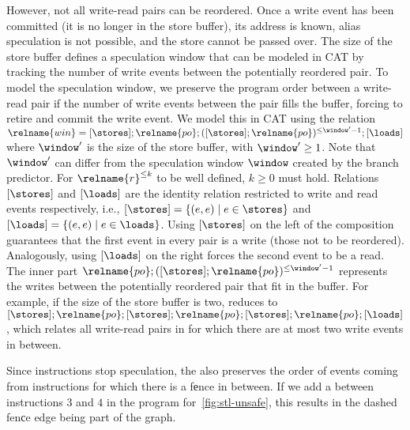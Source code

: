\documentclass[conference]{IEEEtran}
\begin{document}
However, not all write-read pairs can be reordered.
Once a write event has been committed (it is no longer in the store buffer), its address is known, alias speculation is not possible, and the store cannot be passed over.
The size of the store buffer defines a speculation window that can be modeled in CAT by tracking the number of write events between the potentially reordered pair.
To model the speculation window, we preserve the program order between a write-read pair if the number of write events between the pair fills the buffer, forcing to retire and commit the write event.
We model this in CAT using the relation $\relname{win} = {[\stores] ; \relname{po} ; ([\stores] ; \relname{po})^{\leq \window' -1} ; [\loads]}$ where $\window'$ is the size of the store buffer, with $\window'  \geq 1$.
Note that $\window'$ can differ from the speculation window $\window$ created by the branch predictor.
For $\relname{r}^{\leq k}$ to be well defined, $k \geq 0$ must hold.
Relations $[\stores]$ and $[\loads]$ are the identity relation restricted to write and read events respectively, i.e., $[\stores] = \{ (e,e) \mid e \in \stores \}$ and $[\loads] = \{ (e,e) \mid e \in \loads \}$.
Using $[\stores]$ on the left of the composition guarantees that the first event in every pair is a write (those not to be reordered).
Analogously, using $[\loads]$ on the right forces the second event to be a read.
The inner part $\relname{po} ; ([\stores] ; \relname{po})^{\leq \window' -1}$ represents the writes between the potentially reordered pair that fit in the buffer.
For example, if the size of the store buffer is two,  reduces to ${[\stores] ; \relname{po} ; [\stores] ; \relname{po} ; [\stores] ; \relname{po} ; [\loads]}$, which relates all write-read pairs in  for which there are at most two write events in between.

Since \fence instructions stop speculation, the  also preserves the order of events coming from instructions for which there is a {\selectfont f{е}nce} in between. 
If we add a \fence between instructions $3$ and $4$ in the \masm program for~\autoref{fig:stl-unsafe}, this results in the dashed {\selectfont fen{с}e} edge being part of the graph.
\end{document}
